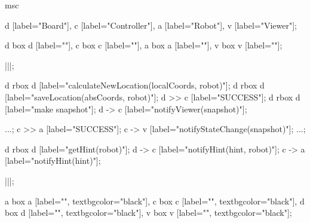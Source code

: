 \begin{msc}
msc
{

d [label="Board"],
c [label="Controller"],
a [label="Robot"],
v [label="Viewer"];

d box d [label=""],
c box c [label=""],
a box a [label=""],
v box v [label=""];

|||;

d rbox d [label="calculateNewLocation(localCoords, robot)"];
d rbox d [label="saveLocation(absCoords, robot)"];
d >> c [label="SUCCESS"];
d rbox d [label="make snapshot"];
d -> c [label="notifyViewer(snapshot)"];

...;
c >> a [label="SUCCESS"];
c -> v [label="notifyStateChange(snapshot)"];
...;

d rbox d [label="getHint(robot)"];
d -> c [label="notifyHint(hint, robot)"];
c -> a [label="notifyHint(hint)"];

|||;

a box a [label="", textbgcolor="black"],
c box c [label="", textbgcolor="black"],
d box d [label="", textbgcolor="black"],
v box v [label="", textbgcolor="black"];

}
\end{msc}
